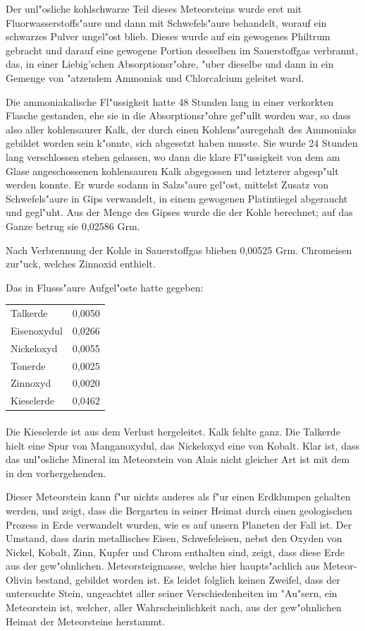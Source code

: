 \documentclass[a4paper, 11pt, oneside]{article}
\begin{document}
Der unl"osliche kohlschwarze Teil dieses Meteorsteins wurde erst mit Fluorwasserstoffs"aure und dann mit Schwefels"aure behandelt, worauf ein schwarzes Pulver ungel"ost blieb. Dieses wurde auf ein gewogenes Philtrum gebracht und darauf eine gewogene Portion desselben im Sauerstoffgas verbrannt, das, in einer Liebig'schen Absorptionsr"ohre, "uber dieselbe und dann in ein Gemenge von "atzendem Ammoniak und Chlorcalcium geleitet ward.

Die ammoniakalische Fl"ussigkeit hatte 48 Stunden lang in einer verkorkten Flasche gestanden, ehe sie in die Absorptionsr"ohre gef"ullt worden war, so dass also aller kohlensaurer Kalk, der durch einen Kohlens"auregehalt des Ammoniaks gebildet worden sein k"onnte, sich abgesetzt haben musste. Sie wurde 24 Stunden lang verschlossen stehen gelassen, wo dann die klare Fl"ussigkeit von dem am Glase angeschossenen kohlensauren Kalk abgegossen und letzterer abgesp"ult werden konnte. Er wurde sodann in Salzs"aure gel"ost, mittelst Zusatz von Schwefels"aure in Gips verwandelt, in einem gewogenen Platintiegel abgeraucht und gegl"uht. Aus der Menge des Gipses wurde die der Kohle berechnet; auf das Ganze betrug sie 0,02586 Grm.

Nach Verbrennung der Kohle in Sauerstoffgas blieben 0,00525 Grm. Chromeisen zur"uck, welches Zinnoxid enthielt.

Das in Flusss"aure Aufgel"oste hatte gegeben:
\begin{center}
\begin{tabular}{ l r }
    Talkerde & 0,0050\\
    Eisenoxydul & 0,0266\\
    Nickeloxyd & 0,0055\\
    Tonerde & 0,0025\\
    Zinnoxyd & 0,0020\\
    Kieselerde & 0,0462\\
\end{tabular}
\end{center}
\paragraph{}
Die Kieselerde ist aus dem Verlust hergeleitet. Kalk fehlte ganz. Die Talkerde hielt eine Spur von Manganoxydul, das Nickeloxyd eine von Kobalt. Klar ist, dass das unl"osliche Mineral im Meteorstein von Alais nicht gleicher Art ist mit dem in den vorhergehenden.

Dieser Meteorstein kann f"ur nichts anderes als f"ur einen Erdklumpen gehalten werden, und zeigt, dass die Bergarten in seiner Heimat durch einen geologischen Prozess in Erde verwandelt wurden, wie es auf unsern Planeten der Fall ist. Der Umstand, dass darin metallisches Eisen, Schwefeleisen, nebst den Oxyden von Nickel, Kobalt, Zinn, Kupfer und Chrom enthalten sind, zeigt, dass diese Erde aus der gew"ohnlichen. Meteorsteigmasse, welche hier haupts"achlich aus Meteor-Olivin bestand, gebildet worden ist. Es leidet folglich keinen Zweifel, dass der untersuchte Stein, ungeachtet aller seiner Verschiedenheiten im "Au"sern, ein Meteorstein ist, welcher, aller Wahrscheinlichkeit nach, aus der gew"ohnlichen Heimat der Meteorsteine herstammt.
\end{document}
